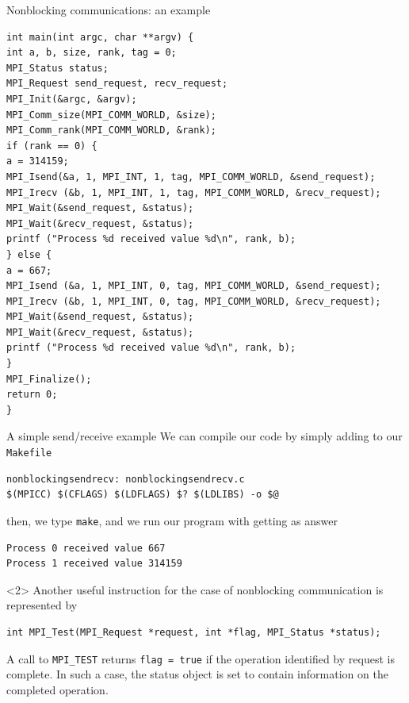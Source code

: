 \documentclass[xcolor={svgnames,usenames}]{beamer}
\begin{document}
\begin{frame}[fragile]{Nonblocking communications: an example}
\scriptsize\vspace{-0.5em}
\begin{verbatim}
int main(int argc, char **argv) {
int a, b, size, rank, tag = 0; 
MPI_Status status;
MPI_Request send_request, recv_request;
MPI_Init(&argc, &argv);
MPI_Comm_size(MPI_COMM_WORLD, &size);
MPI_Comm_rank(MPI_COMM_WORLD, &rank);
if (rank == 0) {
a = 314159; 
MPI_Isend(&a, 1, MPI_INT, 1, tag, MPI_COMM_WORLD, &send_request);
MPI_Irecv (&b, 1, MPI_INT, 1, tag, MPI_COMM_WORLD, &recv_request);
MPI_Wait(&send_request, &status);
MPI_Wait(&recv_request, &status);
printf ("Process %d received value %d\n", rank, b);
} else {
a = 667;
MPI_Isend (&a, 1, MPI_INT, 0, tag, MPI_COMM_WORLD, &send_request);
MPI_Irecv (&b, 1, MPI_INT, 0, tag, MPI_COMM_WORLD, &recv_request);
MPI_Wait(&send_request, &status);
MPI_Wait(&recv_request, &status);
printf ("Process %d received value %d\n", rank, b);
}
MPI_Finalize();
return 0;
}
\end{verbatim}

\end{frame}

\begin{frame}[fragile]{A simple send/receive example}
\small
We can compile our code by simply adding to our \texttt{Makefile} 
\begin{verbatim}
nonblockingsendrecv: nonblockingsendrecv.c
$(MPICC) $(CFLAGS) $(LDFLAGS) $? $(LDLIBS) -o $@
\end{verbatim}
then, we type \texttt{make}, and we run our program with  getting as answer
\begin{verbatim}
Process 0 received value 667
Process 1 received value 314159
\end{verbatim}
\begin{onlyenv}<2>
Another useful instruction for the case of nonblocking communication is represented by 
{\footnotesize
\begin{verbatim}
int MPI_Test(MPI_Request *request, int *flag, MPI_Status *status);
\end{verbatim}
}
A call to \texttt{MPI_TEST} returns \texttt{flag = true} if the operation identified by request is complete.
In such a case, the status object is set to contain information on the completed operation.
\end{onlyenv}

\end{frame}
\end{document}

